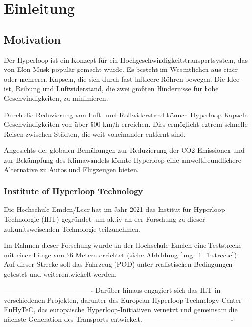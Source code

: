 \chapter{Einleitung}

\section{Motivation}



Der Hyperloop ist ein Konzept für ein Hochgeschwindigkeitstransportsystem, das von Elon Musk \cite{tesla:Hyperloop_impact} populär gemacht wurde. Es besteht im Wesentlichen aus einer oder mehreren Kapseln, die sich durch fast luftleere Röhren bewegen. Die Idee ist, Reibung und Luftwiderstand, die zwei größten Hindernisse für hohe Geschwindigkeiten, zu minimieren.

Durch die Reduzierung von Luft- und Rollwiderstand können Hyperloop-Kapseln Geschwindigkeiten von über 600 km/h erreichen. Dies ermöglicht extrem schnelle Reisen zwischen Städten, die weit voneinander entfernt sind.

Angesichts der globalen Bemühungen zur Reduzierung der CO2-Emissionen und zur Bekämpfung des Klimawandels könnte Hyperloop eine umweltfreundlichere Alternative zu Autos und Flugzeugen bieten.



\subsection{Institute of Hyperloop Technology}
Die Hochschule Emden/Leer hat im Jahr 2021 das Institut für Hyperloop-Technologie (IHT) gegründet, um aktiv an der Forschung zu dieser zukunftsweisenden Technologie teilzunehmen.

Im Rahmen dieser Forschung wurde an der Hochschule Emden eine Teststrecke mit einer Länge von 26 Metern errichtet (siehe Abbildung \ref{img_1_1:strecke}). Auf dieser Strecke soll das Fahrzeug (POD) unter realistischen Bedingungen getestet und weiterentwickelt werden.

\textbf{----------------------------------}\newline
Darüber hinaus engagiert sich das IHT in verschiedenen Projekten, darunter das \frqq European Hyperloop Technology Center – EuHyTeC\flqq, das europäische Hyperloop-Initiativen vernetzt und gemeinsam die nächste Generation des Transports entwickelt.\newline
\textbf{----------------------------------}

